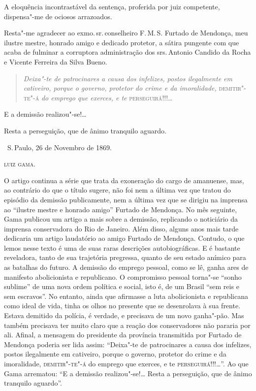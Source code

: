 A eloquência incontrastável da sentença, proferida por juiz competente,
dispensa"-me de ociosos arrazoados.

Resta"-me agradecer ao exmo.\,sr.\,conselheiro F.\,M.\,S. Furtado de
Mendonça, meu ilustre mestre, honrado amigo e dedicado protetor, a
sátira pungente com que acaba de fulminar a corruptora administração dos
srs.\,Antonio Candido da Rocha e Vicente Ferreira da Silva Bueno.

\begin{quote}
\emph{Deixa"-te de patrocinares a causa dos infelizes, postos
ilegalmente em cativeiro, porque o governo, protetor do crime e da
imoralidade,} \textsc{demitir"-te"-á} \emph{do emprego que exerces, e te}
\textsc{perseguirá}!!!\ldots{}
\end{quote}

E a demissão realizou"-se!\ldots{}

Resta a perseguição, que de ânimo tranquilo aguardo.

\vfill

\hfill\ S.\,Paulo, 26 de Novembro de 1869.\smallskip

\hfill\textsc{luiz gama.}

\pagebreak
\mbox{}\vfill
\thispagestyle{empty}

{\small\noindent
O artigo continua a série que trata da exoneração do cargo de
amanuense, mas, ao contrário do que o título sugere, não foi nem a
última vez que tratou do episódio da demissão publicamente, nem a última
vez que se dirigiu na imprensa ao ``ilustre mestre e honrado amigo''
Furtado de Mendonça. No mês seguinte, Gama publicou um artigo a mais
sobre a demissão, replicando o noticiário da imprensa conservadora do
Rio de Janeiro. Além disso, alguns anos mais tarde dedicaria um artigo
laudatório ao amigo Furtado de Mendonça. Contudo, o que lemos nesse texto é uma de
suas raras descrições autobiográficas. E é bastante reveladora, tanto de
sua trajetória pregressa, quanto de seu estado anímico para as batalhas
do futuro. A demissão do emprego pessoal, como se lê, ganha ares de
manifesto abolicionista e republicano. O compromisso pessoal torna"-se
``sonho sublime'' de uma nova ordem política e social, isto é, de um
Brasil ``sem reis e sem escravos''. No entanto, ainda que afirmasse a luta
abolicionista e republicana como ideal de vida, tinha os olhos no
presente que se desenrolava à sua frente. Estava demitido da polícia, é
verdade, e precisava de um novo ganha"-pão. Mas
também precisava ter muito claro que a reação dos conservadores não
pararia por ali. Afinal, a
mensagem do presidente da província transmitida por Furtado de Mendonça
poderia ser lida assim: ``Deixa"-te de patrocinares a causa dos infelizes,
postos ilegalmente em cativeiro, porque o governo, protetor do crime e
da imoralidade, \textsc{demitir"-te"-á} do emprego que exerces, e te
\textsc{perseguirá}!!!\ldots{}''. Ao que Gama arrematou: ``E a demissão realizou"-se!\ldots{}
Resta a perseguição, que de ânimo tranquilo aguardo''.}

